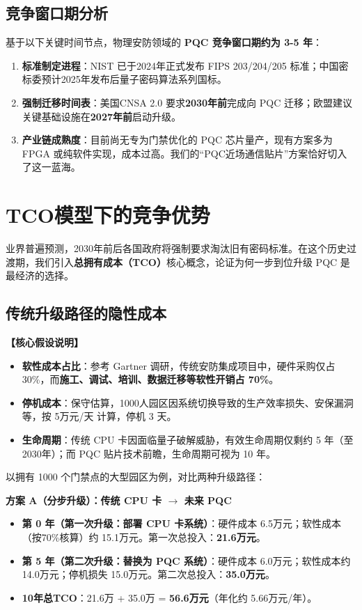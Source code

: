 \subsection{竞争窗口期分析}

基于以下关键时间节点，物理安防领域的 \textbf{PQC 竞争窗口期约为 3-5 年}：
\begin{enumerate}
	\item \textbf{标准制定进程}：NIST 已于2024年正式发布 FIPS 203/204/205 标准；中国密标委预计2025年发布后量子密码算法系列国标。
	\item \textbf{强制迁移时间表}：美国CNSA 2.0 要求\textbf{2030年前}完成向 PQC 迁移；欧盟建议关键基础设施在\textbf{2027年前}启动升级。
	\item \textbf{产业链成熟度}：目前尚无专为门禁优化的 PQC 芯片量产，现有方案多为 FPGA 或纯软件实现，成本过高。我们的“PQC近场通信贴片”方案恰好切入了这一蓝海。
\end{enumerate}

\section{TCO模型下的竞争优势}

业界普遍预测，2030年前后各国政府将强制要求淘汰旧有密码标准。在这个历史过渡期，我们引入\textbf{总拥有成本（TCO）}核心概念，论证为何一步到位升级 PQC 是最经济的选择。

\subsection{传统升级路径的隐性成本}

\textbf{【核心假设说明】}
\begin{itemize}
	\item \textbf{软性成本占比}：参考 Gartner 调研，传统安防集成项目中，硬件采购仅占 30\%，而\textbf{施工、调试、培训、数据迁移等软性开销占 70\%}。
	\item \textbf{停机成本}：保守估算，1000人园区因系统切换导致的生产效率损失、安保漏洞等，按 5万元/天 计算，停机 3 天。
	\item \textbf{生命周期}：传统 CPU 卡因面临量子破解威胁，有效生命周期仅剩约 5 年（至2030年）；而 PQC 贴片技术前瞻，生命周期可视为 10 年。
\end{itemize}

以拥有 1000 个门禁点的大型园区为例，对比两种升级路径：

\vspace{0.5em}
\noindent\textbf{方案 A（分步升级）：传统 CPU 卡 $\rightarrow$ 未来 PQC}
\begin{itemize}
	\item \textbf{第 0 年（第一次升级：部署 CPU 卡系统）}：硬件成本 6.5万元；软性成本（按70\%核算）约 15.1万元。第一次总投入：\textbf{21.6万元}。
	\item \textbf{第 5 年（第二次升级：替换为 PQC 系统）}：硬件成本 6.0万元；软性成本约 14.0万元；停机损失 15.0万元。第二次总投入：\textbf{35.0万元}。
	\item \textbf{10年总TCO}：21.6万 + 35.0万 = \textbf{56.6万元}（年化约 5.66万元/年）。
\end{itemize}

